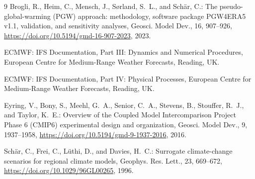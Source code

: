 \documentclass[11pt,a4paper]{article}
\begin{document}
\begin{thebibliography}{9}
Brogli, R., Heim, C., Mensch, J., S{\o}rland, S.~L., and Sch{\"a}r, C.:
The pseudo-global-warming (PGW) approach: methodology, software package
PGW4ERA5 v1.1, validation, and sensitivity analyses, Geosci. Model Dev., 16,
907--926, \url{https://doi.org/10.5194/gmd-16-907-2023}, 2023.

ECMWF: IFS Documentation, Part III: Dynamics and Numerical Procedures,
European Centre for Medium-Range Weather Forecasts, Reading, UK.

ECMWF: IFS Documentation, Part IV: Physical Processes, European Centre for
Medium-Range Weather Forecasts, Reading, UK.

Eyring, V., Bony, S., Meehl, G.~A., Senior, C.~A., Stevens, B., Stouffer,
R.~J., and Taylor, K.~E.: Overview of the Coupled Model Intercomparison
Project Phase 6 (CMIP6) experimental design and organization, Geosci. Model
Dev., 9, 1937--1958, \url{https://doi.org/10.5194/gmd-9-1937-2016}, 2016.

Sch{\"a}r, C., Frei, C., L{\"u}thi, D., and Davies, H.~C.: Surrogate
climate-change scenarios for regional climate models, Geophys. Res. Lett.,
23, 669--672, \url{https://doi.org/10.1029/96GL00265}, 1996.
\end{thebibliography}
\end{document}
